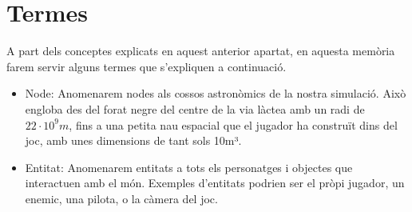 \section{Termes}
A part dels conceptes explicats en aquest anterior apartat, en aquesta memòria farem servir alguns termes que s'expliquen a continuació.
\begin{itemize}
  \item{Node: }Anomenarem nodes als cossos astronòmics de la nostra simulació. Això engloba des del forat negre del centre de la via làctea amb un radi de $22\cdot10^{9}m$, fins a una petita nau espacial que el jugador ha construït dins del joc, amb unes dimensions de tant sols 10m³.
  \item{Entitat: }Anomenarem entitats a tots els personatges i objectes que interactuen amb el món. Exemples d'entitats podrien ser el pròpi jugador, un enemic, una pilota, o la càmera del joc.
\end{itemize}
